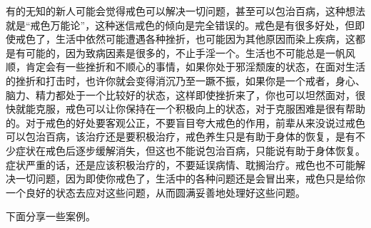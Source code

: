 有的无知的新人可能会觉得戒色可以解决一切问题，甚至可以包治百病，这种想法就是“戒色万能论”，这种迷信戒色的倾向是完全错误的。戒色是有很多好处，但即使戒色了，生活中依然可能遭遇各种挫折，也可能因为其他原因而染上疾病，这都是有可能的，因为致病因素是很多的，不止手淫一个。生活也不可能总是一帆风顺，肯定会有一些挫折和不顺心的事情，如果你处于邪淫颓废的状态，在面对生活的挫折和打击时，也许你就会变得消沉乃至一蹶不振，如果你是一个戒者，身心、脑力、精力都处于一个比较好的状态，这样即使挫折来了，你也可以坦然面对，很快就能克服，戒色可以让你保持在一个积极向上的状态，对于克服困难是很有帮助的。对于戒色的好处要客观公正，不要盲目夸大戒色的作用，前辈从来没说过戒色可以包治百病，该治疗还是要积极治疗，戒色养生只是有助于身体的恢复，是有不少症状在戒色后逐步缓解消失，但这也不能说包治百病，只能说有助于身体恢复。症状严重的话，还是应该积极治疗的，不要延误病情、耽搁治疗。戒色也不可能解决一切问题，因为即使你戒色了，生活中的各种问题还是会冒出来，戒色只是给你一个良好的状态去应对这些问题，从而圆满妥善地处理好这些问题。

下面分享一些案例。

